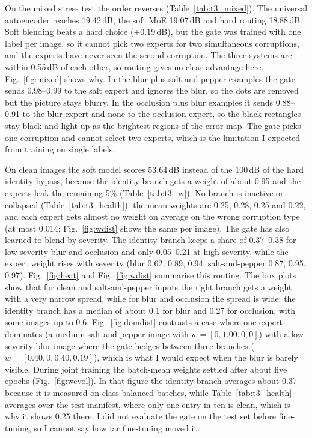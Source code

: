 \documentclass[journal,onecolumn,12pt,a4paper]{IEEEtran}
\begin{document}
On the mixed stress test the order reverses (Table~\ref{tab:t3_mixed}). The universal autoencoder reaches 19.42\,dB, the soft MoE 19.07\,dB and hard routing 18.88\,dB. Soft blending beats a hard choice (+0.19\,dB), but the gate was trained with one label per image, so it cannot pick two experts for two simultaneous corruptions, and the experts have never seen the second corruption. The three systems are within 0.55\,dB of each other, so routing gives no clear advantage here. Fig.~\ref{fig:mixed} shows why. In the blur plus salt-and-pepper examples the gate sends 0.98--0.99 to the salt expert and ignores the blur, so the dots are removed but the picture stays blurry. In the occlusion plus blur examples it sends 0.88--0.91 to the blur expert and none to the occlusion expert, so the black rectangles stay black and light up as the brightest regions of the error map. The gate picks one corruption and cannot select two experts, which is the limitation I expected from training on single labels.

On clean images the soft model scores 53.64\,dB instead of the 100\,dB of the hard identity bypass, because the identity branch gets a weight of about 0.95 and the experts leak the remaining 5\% (Table~\ref{tab:t3_w}). No branch is inactive or collapsed (Table~\ref{tab:t3_health}): the mean weights are 0.25, 0.28, 0.25 and 0.22, and each expert gets almost no weight on average on the wrong corruption type (at most 0.014; Fig.~\ref{fig:wdist} shows the same per image). The gate has also learned to blend by severity. The identity branch keeps a share of 0.37--0.38 for low-severity blur and occlusion and only 0.05--0.21 at high severity, while the expert weight rises with severity (blur 0.62, 0.89, 0.94; salt-and-pepper 0.87, 0.95, 0.97). Fig.~\ref{fig:heat} and Fig.~\ref{fig:wdist} summarise this routing. The box plots show that for clean and salt-and-pepper inputs the right branch gets a weight with a very narrow spread, while for blur and occlusion the spread is wide: the identity branch has a median of about 0.1 for blur and 0.27 for occlusion, with some images up to 0.6. Fig.~\ref{fig:domdist} contrasts a case where one expert dominates (a medium salt-and-pepper image with $w=[0,1.00,0,0]$) with a low-severity blur image where the gate hedges between three branches ($w=[0.40,0,0.40,0.19]$), which is what I would expect when the blur is barely visible. During joint training the batch-mean weights settled after about five epochs (Fig.~\ref{fig:wevol}). In that figure the identity branch averages about 0.37 because it is measured on class-balanced batches, while Table~\ref{tab:t3_health} averages over the test manifest, where only one entry in ten is clean, which is why it shows 0.25 there. I did not evaluate the gate on the test set before fine-tuning, so I cannot say how far fine-tuning moved it.
\end{document}
